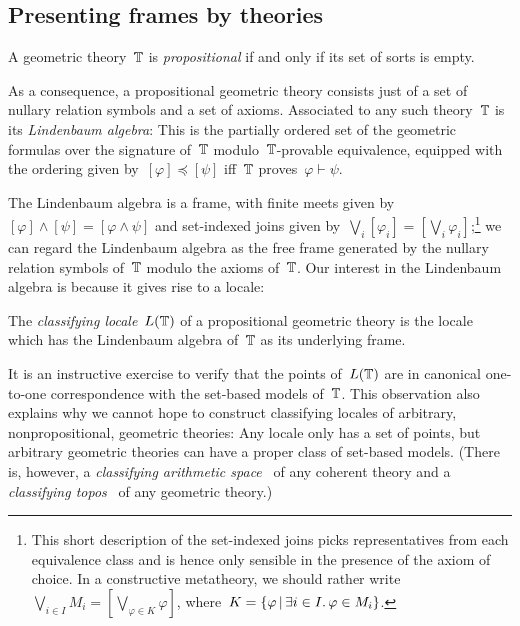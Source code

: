 \documentclass{ws-rv9x6}
\begin{document}
{\subsection{Presenting frames by theories}
\label{sect:presenting-frames}

\begin{definition}A geometric theory~$\mathbb{T}$ is \emph{propositional} if and only
if its set of sorts is empty.\end{definition}

As a consequence, a propositional geometric theory consists just of a set of
nullary relation symbols and a set of axioms. Associated to any such
theory~$\mathbb{T}$ is its \emph{Lindenbaum algebra}: This is the partially ordered
set of the geometric formulas over the signature of~$\mathbb{T}$ modulo~$\mathbb{T}$-provable
equivalence, equipped with the ordering given by~$[\varphi] \preceq [\psi]$ iff~$\mathbb{T}$
proves~$\varphi \vdash \psi$.

The Lindenbaum algebra is a frame, with finite meets given by~$[\varphi] \wedge
[\psi] = [\varphi \wedge \psi]$ and set-indexed joins given by~$\bigvee_i
[\varphi_i] = [\bigvee_i \varphi_i]$;\footnote{This short description of the
set-indexed joins picks representatives from each equivalence class and is
hence only sensible in the presence of the axiom of choice. In a
constructive metatheory, we should rather write~$\bigvee_{i \in I} M_i =
[\bigvee_{\varphi \in K} \varphi]$, where~$K = \{ \varphi \,|\, \exists i \in
I\mathpunct{.} \varphi \in M_i \}$.} we can regard the Lindenbaum algebra as the free
frame generated by the nullary relation symbols of~$\mathbb{T}$ modulo the axioms
of~$\mathbb{T}$. Our interest in the Lindenbaum algebra is because it gives rise to a
locale:

\begin{definition}The \emph{classifying locale}~$L(\mathbb{T})$ of a propositional
geometric theory is the locale which has the Lindenbaum algebra of~$\mathbb{T}$ as its
underlying frame.\end{definition}

It is an instructive exercise to verify that the points of~$L(\mathbb{T})$ are in
canonical one-to-one correspondence with the set-based models of~$\mathbb{T}$. This
observation also explains why we cannot hope to construct classifying
locales of arbitrary, nonpropositional, geometric theories: Any locale only has
a set of points, but arbitrary geometric theories can have a proper class of
set-based models. (There is, however, a \emph{classifying arithmetic
space}~\cite{vickers:sketches} of any coherent theory and a \emph{classifying
topos}~\cite[Section~2]{caramello:tst} of any geometric theory.)

}
\end{document}
